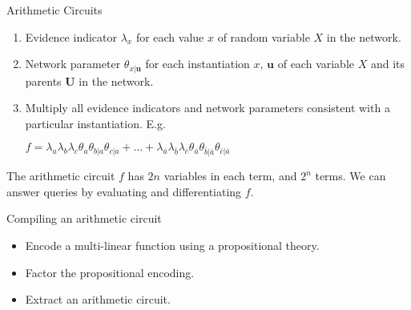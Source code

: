 \documentclass[xcolor={table}]{beamer}
\begin{document}
\begin{frame}{Arithmetic Circuits}

\begin{enumerate}
\item Evidence indicator $\lambda_{x}$ for each value $x$ of random variable $X$ in the network.
\item Network parameter $\theta_{x|\mathbf{u}}$ for each instantiation $x$, $\mathbf{u}$ of each variable $X$ and its parents $\mathbf{U}$ in the network.
\item Multiply all evidence indicators and network parameters consistent with a particular instantiation. E.g.

$f = \lambda_{a}\lambda_{b}\lambda_{c}\theta_{a}\theta_{b|a}\theta_{c|a} + \ldots + \lambda_{\bar{a}}\lambda_{\bar{b}}\lambda_{\bar{c}}\theta_{\bar{a}}\theta_{\bar{b}|\bar{a}}\theta_{\bar{c}|\bar{a}} $
\end{enumerate}
The arithmetic circuit $f$ has $2n$ variables in each term, and $2^{n}$ terms.
We can answer queries by evaluating and differentiating $f$.
\end{frame}

\begin{frame}{Compiling an arithmetic circuit}%
\begin{itemize}
\item Encode a multi-linear function using a propositional theory. %
\item Factor the propositional encoding. %
\item Extract an arithmetic circuit. %
\end{itemize}
\end{frame}
\end{document}
